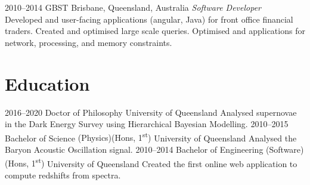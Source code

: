 \documentclass[]{friggeri-cv2}
\begin{document}
\begin{entrylist}

\entry
{2010--2014}
{GBST}
{Brisbane, Queensland, Australia}
{\emph{Software Developer} \\
Developed  and user-facing applications (angular, Java)
for front office financial traders. Created and optimised large scale  queries.
Optimised  and applications for network, processing, and memory constraints.}

\end{entrylist}


\section{Education}

\begin{entrylist}
\entry
{2016--2020}
{Doctor of Philosophy}
{University of Queensland}
{Analysed supernovae in the Dark Energy Survey using Hierarchical Bayesian Modelling.}
\entry
{2010--2015}
{Bachelor of Science {\normalfont (Physics)(Hons, 1\textsuperscript{st})}}
{University of Queensland}
{Analysed the Baryon Acoustic Oscillation signal.}
\entry
{2010--2014}
{Bachelor of Engineering {\normalfont (Software)(Hons, 1\textsuperscript{st})}}
{University of Queensland}
{Created the first online web application to compute redshifts from spectra.}
\end{entrylist}
\end{document}
